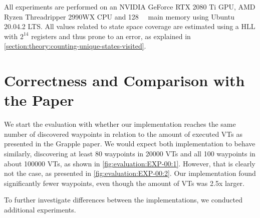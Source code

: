 \documentclass[
fancyheadings, %
%
%
]{stsreprt}
\begin{document}
All experiments are performed on an NVIDIA GeForce RTX 2080 Ti GPU, AMD Ryzen Threadripper 2990WX CPU and \SI{128}{\giga\byte} main memory using Ubuntu 20.04.2 LTS.
All values related to state space coverage are estimated using a HLL with $2^{14}$ registers and thus prone to an error, as explained in \cref{section:theory:counting-unique-states-visited}.

\section{Correctness and Comparison with the Paper}
\label{section:evaluation:correctness-comparison-with-paper}

We start the evaluation with whether our implementation reaches the same number of discovered waypoints in relation to the amount of executed VTs as presented in the Grapple paper.
We would expect both implementation to behave similarly, discovering at least 80 waypoints in \num{20000} VTs and all 100 waypoints in about \num{100000} VTs, as shown in \cref{fig:evaluation:EXP-00:1}.
However, that is clearly not the case, as presented in \cref{fig:evaluation:EXP-00:2}.
Our implementation found significantly fewer waypoints, even though the amount of VTs was 2.5x larger.

To further investigate differences between the implementations, we conducted additional experiments.
\end{document}
